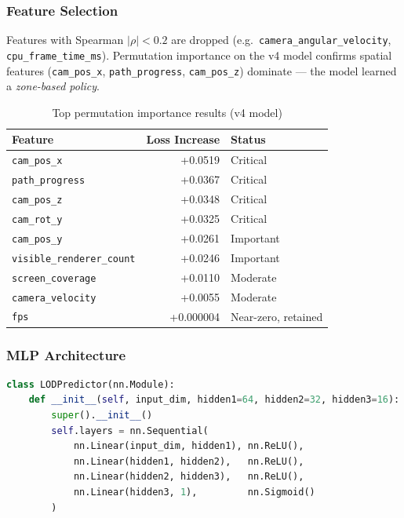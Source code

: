 \documentclass[12pt, a4paper]{article}
\begin{document}
\subsubsection{Feature Selection}

Features with Spearman $|\rho| < 0.2$ are dropped (e.g.\ \texttt{camera\_angular\_velocity},
\texttt{cpu\_frame\_time\_ms}). Permutation importance on the v4 model confirms
spatial features (\texttt{cam\_pos\_x}, \texttt{path\_progress},
\texttt{cam\_pos\_z}) dominate — the model learned a \emph{zone-based policy}.

\begin{table}[H]
\centering
\caption{Top permutation importance results (v4 model)}
\label{tab:permimport}
\begin{tabular}{l r l}
\toprule
Feature & Loss Increase & Status\\
\midrule
\texttt{cam\_pos\_x} & +0.0519 & Critical\\
\texttt{path\_progress} & +0.0367 & Critical\\
\texttt{cam\_pos\_z} & +0.0348 & Critical\\
\texttt{cam\_rot\_y} & +0.0325 & Critical\\
\texttt{cam\_pos\_y} & +0.0261 & Important\\
\texttt{visible\_renderer\_count} & +0.0246 & Important\\
\texttt{screen\_coverage} & +0.0110 & Moderate\\
\texttt{camera\_velocity} & +0.0055 & Moderate\\
\texttt{fps} & +0.000004 & Near-zero, retained\\
\bottomrule
\end{tabular}
\end{table}

\subsubsection{MLP Architecture}

\begin{lstlisting}[language=Python, caption=Stage 1 LODPredictor (PyTorch)]
class LODPredictor(nn.Module):
    def __init__(self, input_dim, hidden1=64, hidden2=32, hidden3=16):
        super().__init__()
        self.layers = nn.Sequential(
            nn.Linear(input_dim, hidden1), nn.ReLU(),
            nn.Linear(hidden1, hidden2),   nn.ReLU(),
            nn.Linear(hidden2, hidden3),   nn.ReLU(),
            nn.Linear(hidden3, 1),         nn.Sigmoid()
        )
\end{lstlisting}
\end{document}
